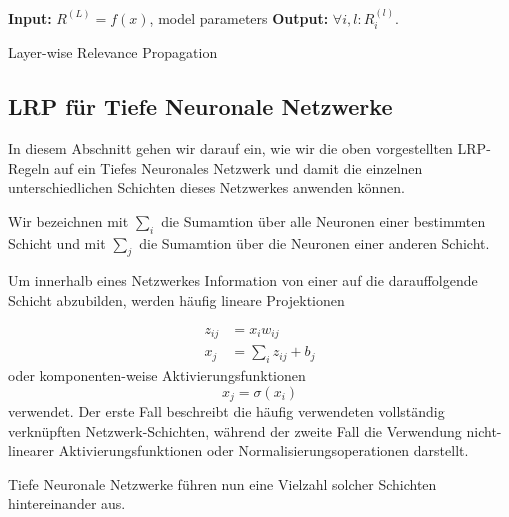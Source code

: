 \documentclass[11pt,a4paper]{article}
\numberwithin{equation}{section}
\begin{document}
	
	\begin{algorithm}
		\hspace*{\algorithmicindent} \textbf{Input: } $R^{(L)} = f(x)$, model parameters \newline
		\hspace*{\algorithmicindent} \textbf{Output: } $\forall i,l: R_i^{(l)}$. 
		
		\caption{Layer-wise Relevance Propagation}
		\label{alg:lrp}
		
		\begin{algorithmic}
			\ENDFOR
		\end{algorithmic}
	\end{algorithm}	

	

	
	
	
	\subsection{LRP für Tiefe Neuronale Netzwerke}
	In diesem Abschnitt gehen wir darauf ein, wie wir die oben vorgestellten LRP-Regeln auf ein Tiefes Neuronales Netzwerk und damit die einzelnen unterschiedlichen Schichten dieses Netzwerkes anwenden können.
	
	Wir bezeichnen mit $\sum_i$ die Sumamtion über alle Neuronen einer bestimmten Schicht und mit $\sum_j$ die Sumamtion über die Neuronen einer anderen Schicht. 
	
	Um innerhalb eines Netzwerkes Information von einer auf die darauffolgende Schicht abzubilden, werden häufig lineare Projektionen
	
	\begin{align}
		z_{ij} &= x_iw_{ij}\\
		x_j &= \sum_i{z_{ij} + b_j} \label{eq:linear_projection}
	\end{align}
	 oder komponenten-weise Aktivierungsfunktionen
	 \begin{equation}
	 	x_j = \sigma(x_i)
	 \end{equation}
	 verwendet.
	 Der erste Fall beschreibt die häufig verwendeten vollständig verknüpften Netzwerk-Schichten, während der zweite Fall die Verwendung nicht-linearer Aktivierungsfunktionen oder Normalisierungsoperationen darstellt.
	 
	 Tiefe Neuronale Netzwerke führen nun eine Vielzahl solcher Schichten hintereinander aus.
	 
\end{document}
